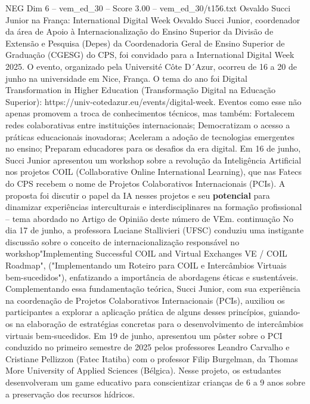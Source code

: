 \begin{textsample}{NEG Dim 6 – vem\_ed\_30 – Score 3.00 – vem\_ed\_30/t156.txt}  \label{ex:f6_neg_069}
Osvaldo Succi Junior na França: International Digital Week Osvaldo Succi Junior, coordenador da área de Apoio à Internacionalização do Ensino Superior da Divisão de Extensão e Pesquisa (Depes) da Coordenadoria Geral de Ensino Superior de Graduação (CGESG) do CPS, foi convidado para a International Digital Week 2025.
O evento, organizado pela Université Côte D´Azur, ocorreu de 16 a 20 de junho na universidade em Nice, França.
O tema do ano foi Digital Transformation in Higher Education (Transformação Digital na Educação Superior): https://univ-cotedazur.eu/events/digital-week.
Eventos como esse não apenas promovem a troca de conhecimentos técnicos, mas também: Fortalecem redes colaborativas entre instituições internacionais; Democratizam o acesso a práticas educacionais inovadoras; Aceleram a adoção de tecnologias emergentes no ensino; Preparam educadores para os desafios da era digital.
Em 16 de junho, Succi Junior apresentou um workshop sobre a revolução da Inteligência Artificial nos projetos COIL (Collaborative Online International Learning), que nas Fatecs do CPS recebem o nome de Projetos Colaborativos Internacionais (PCIs).
A proposta foi discutir o papel da IA nesses projetos e seu \textbf{potencial} para dinamizar experiências interculturais e interdisciplinares na formação profissional – tema abordado no Artigo de Opinião deste número de VEm. continuação No dia 17 de junho, a professora Luciane Stallivieri (UFSC) conduziu uma instigante discussão sobre o conceito de internacionalização responsável no workshop"Implementing Successful COIL and Virtual Exchanges VE / COIL Roadmap", ("Implementando um Roteiro para COIL e Intercâmbios Virtuais bem-sucedidos"), enfatizando a importância de abordagens éticas e sustentáveis.
Complementando essa fundamentação teórica, Succi Junior, com sua experiência na coordenação de Projetos Colaborativos Internacionais (PCIs), auxiliou os participantes a explorar a aplicação prática de alguns desses princípios, guiando-os na elaboração de estratégias concretas para o desenvolvimento de intercâmbios virtuais bem-sucedidos.
Em 19 de junho, apresentou um pôster sobre o PCI conduzido no primeiro semestre de 2025 pelos professores Leandro Carvalho e Cristiane Pellizzon (Fatec Itatiba) com o professor Filip Burgelman, da Thomas More University of Applied Sciences (Bélgica).
Nesse projeto, os estudantes desenvolveram um game educativo para conscientizar crianças de 6 a 9 anos sobre a preservação dos recursos hídricos.

\end{textsample}
